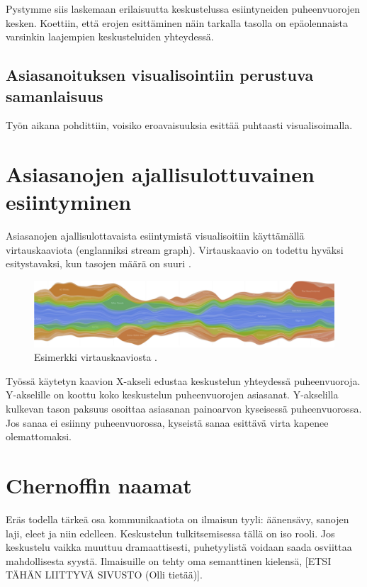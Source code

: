 \documentclass[11pt,a4paper,oneside]{memoir}
\begin{document}
Pystymme siis laskemaan erilaisuutta keskustelussa esiintyneiden puheenvuorojen kesken. Koettiin, että erojen esittäminen näin tarkalla tasolla on epäolennaista varsinkin laajempien keskusteluiden yhteydessä.

\subsection{Asiasanoituksen visualisointiin perustuva samanlaisuus}

Työn aikana pohdittiin, voisiko eroavaisuuksia esittää puhtaasti visualisoimalla.

\section{Asiasanojen ajallisulottuvainen esiintyminen}
Asiasanojen ajallisulottavaista esiintymistä visualisoitiin käyttämällä virtauskaaviota (englanniksi stream graph). Virtauskaavio on todettu hyväksi esitystavaksi, kun tasojen määrä on suuri \cite{byron-wattenberg:stacked-graphs}.

\begin{figure}[H]
  \centering
  \includegraphics[width=13cm]{stream-graph}
  \caption{Esimerkki virtauskaaviosta \cite{byron-wattenberg:stacked-graphs}.}
  \label{fig:stream-graph}
\end{figure}

Työssä käytetyn kaavion X-akseli edustaa keskustelun yhteydessä puheenvuoroja. Y-akselille on koottu koko keskustelun puheenvuorojen asiasanat. Y-akselilla kulkevan tason paksuus osoittaa asiasanan painoarvon kyseisessä puheenvuorossa. Jos sanaa ei esiinny puheenvuorossa, kyseistä sanaa esittävä virta kapenee olemattomaksi.

\section{Chernoffin naamat}
Eräs todella tärkeä osa kommunikaatiota on ilmaisun tyyli: äänensävy, sanojen laji, eleet ja niin edelleen. Keskustelun tulkitsemisessa tällä on iso rooli. Jos keskustelu vaikka muuttuu dramaattisesti, puhetyylistä voidaan saada osviittaa mahdollisesta syystä. Ilmaisuille on tehty oma semanttinen kielensä, [ETSI TÄHÄN LIITTYVÄ SIVUSTO (Olli tietää)].
\end{document}

